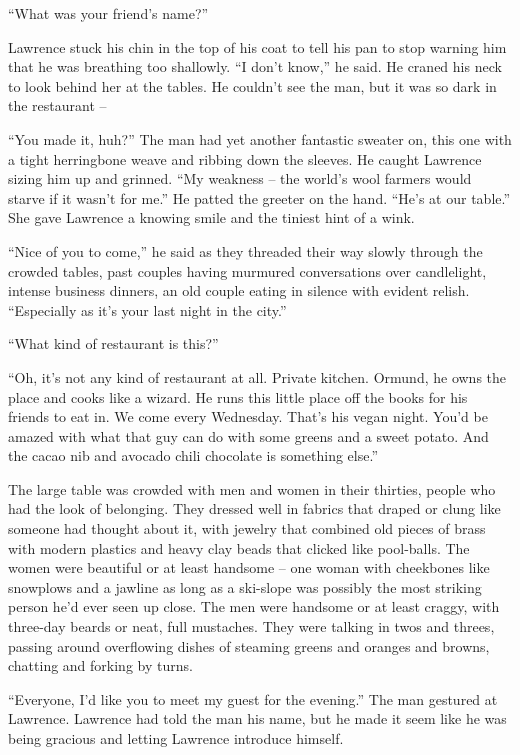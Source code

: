 “What was your friend's name?”

Lawrence stuck his chin in the top of his coat to tell his pan to stop 
warning him that he was breathing too shallowly. “I don't know,” he 
said. He craned his neck to look behind her at the tables. He couldn't 
see the man, but it was so dark in the restaurant --

“You made it, huh?” The man had yet another fantastic sweater on, 
this one with a tight herringbone weave and ribbing down the sleeves. 
He caught Lawrence sizing him up and grinned. “My weakness -- the 
world's wool farmers would starve if it wasn't for me.” He patted the 
greeter on the hand. “He's at our table.” She gave Lawrence a 
knowing smile and the tiniest hint of a wink.

“Nice of you to come,” he said as they threaded their way slowly 
through the crowded tables, past couples having murmured conversations 
over candlelight, intense business dinners, an old couple eating in 
silence with evident relish. “Especially as it's your last night in 
the city.”

“What kind of restaurant is this?”

“Oh, it's not any kind of restaurant at all. Private kitchen. Ormund, 
he owns the place and cooks like a wizard. He runs this little place 
off the books for his friends to eat in. We come every Wednesday. 
That's his vegan night. You'd be amazed with what that guy can do with 
some greens and a sweet potato. And the cacao nib and avocado chili 
chocolate is something else.”

The large table was crowded with men and women in their thirties, 
people who had the look of belonging. They dressed well in fabrics that 
draped or clung like someone had thought about it, with jewelry that 
combined old pieces of brass with modern plastics and heavy clay beads 
that clicked like pool-balls. The women were beautiful or at least 
handsome -- one woman with cheekbones like snowplows and a jawline as 
long as a ski-slope was possibly the most striking person he'd ever 
seen up close. The men were handsome or at least craggy, with three-day 
beards or neat, full mustaches. They were talking in twos and threes, 
passing around overflowing dishes of steaming greens and oranges and 
browns, chatting and forking by turns.

“Everyone, I'd like you to meet my guest for the evening.” The man 
gestured at Lawrence. Lawrence had told the man his name, but he made 
it seem like he was being gracious and letting Lawrence introduce 
himself.


